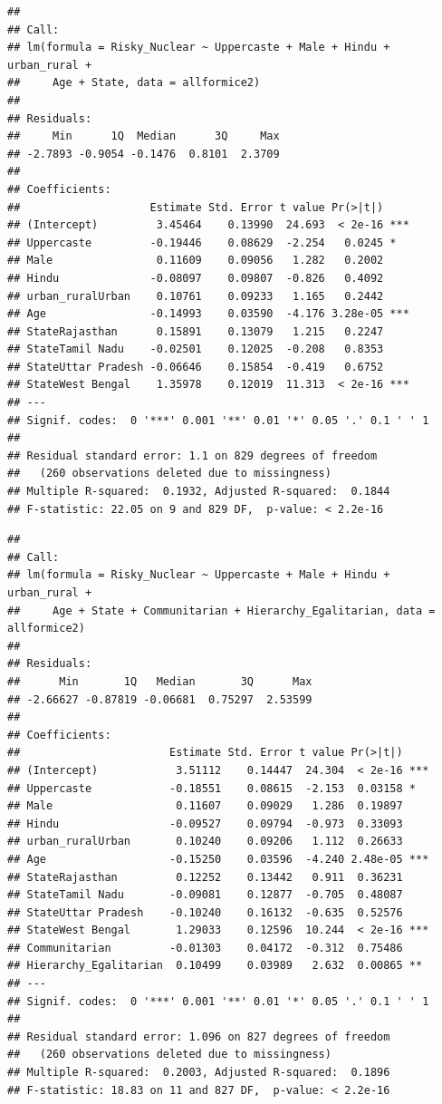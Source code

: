 \documentclass[
]{article}
\begin{document}
\begin{verbatim}
## 
## Call:
## lm(formula = Risky_Nuclear ~ Uppercaste + Male + Hindu + urban_rural + 
##     Age + State, data = allformice2)
## 
## Residuals:
##     Min      1Q  Median      3Q     Max 
## -2.7893 -0.9054 -0.1476  0.8101  2.3709 
## 
## Coefficients:
##                    Estimate Std. Error t value Pr(>|t|)    
## (Intercept)         3.45464    0.13990  24.693  < 2e-16 ***
## Uppercaste         -0.19446    0.08629  -2.254   0.0245 *  
## Male                0.11609    0.09056   1.282   0.2002    
## Hindu              -0.08097    0.09807  -0.826   0.4092    
## urban_ruralUrban    0.10761    0.09233   1.165   0.2442    
## Age                -0.14993    0.03590  -4.176 3.28e-05 ***
## StateRajasthan      0.15891    0.13079   1.215   0.2247    
## StateTamil Nadu    -0.02501    0.12025  -0.208   0.8353    
## StateUttar Pradesh -0.06646    0.15854  -0.419   0.6752    
## StateWest Bengal    1.35978    0.12019  11.313  < 2e-16 ***
## ---
## Signif. codes:  0 '***' 0.001 '**' 0.01 '*' 0.05 '.' 0.1 ' ' 1
## 
## Residual standard error: 1.1 on 829 degrees of freedom
##   (260 observations deleted due to missingness)
## Multiple R-squared:  0.1932, Adjusted R-squared:  0.1844 
## F-statistic: 22.05 on 9 and 829 DF,  p-value: < 2.2e-16
\end{verbatim}

\begin{verbatim}
## 
## Call:
## lm(formula = Risky_Nuclear ~ Uppercaste + Male + Hindu + urban_rural + 
##     Age + State + Communitarian + Hierarchy_Egalitarian, data = allformice2)
## 
## Residuals:
##      Min       1Q   Median       3Q      Max 
## -2.66627 -0.87819 -0.06681  0.75297  2.53599 
## 
## Coefficients:
##                       Estimate Std. Error t value Pr(>|t|)    
## (Intercept)            3.51112    0.14447  24.304  < 2e-16 ***
## Uppercaste            -0.18551    0.08615  -2.153  0.03158 *  
## Male                   0.11607    0.09029   1.286  0.19897    
## Hindu                 -0.09527    0.09794  -0.973  0.33093    
## urban_ruralUrban       0.10240    0.09206   1.112  0.26633    
## Age                   -0.15250    0.03596  -4.240 2.48e-05 ***
## StateRajasthan         0.12252    0.13442   0.911  0.36231    
## StateTamil Nadu       -0.09081    0.12877  -0.705  0.48087    
## StateUttar Pradesh    -0.10240    0.16132  -0.635  0.52576    
## StateWest Bengal       1.29033    0.12596  10.244  < 2e-16 ***
## Communitarian         -0.01303    0.04172  -0.312  0.75486    
## Hierarchy_Egalitarian  0.10499    0.03989   2.632  0.00865 ** 
## ---
## Signif. codes:  0 '***' 0.001 '**' 0.01 '*' 0.05 '.' 0.1 ' ' 1
## 
## Residual standard error: 1.096 on 827 degrees of freedom
##   (260 observations deleted due to missingness)
## Multiple R-squared:  0.2003, Adjusted R-squared:  0.1896 
## F-statistic: 18.83 on 11 and 827 DF,  p-value: < 2.2e-16
\end{verbatim}
\end{document}
